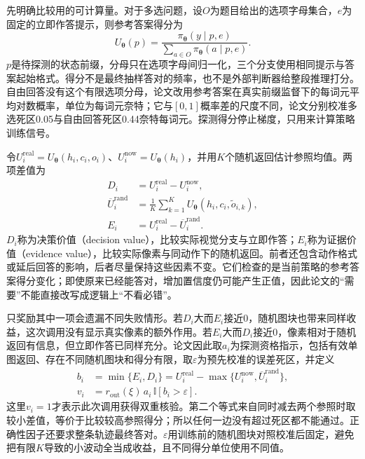 先明确比较用的可计算量。对于多选问题，设$O$为题目给出的选项字母集合，$e$为固定的立即作答提示，则参考答案得分为
\begin{equation}
  U_{\bm\theta}(p)
   =\frac{\pi_{\bm\theta}(y\mid p,e)}
          {\sum_{a\in O}\pi_{\bm\theta}(a\mid p,e)}.
  \label{eq:vision-countercredit-score}
\end{equation}
$p$是待探测的状态前缀，分母只在选项字母间归一化，三个分支使用相同提示与答案起始格式。得分不是最终抽样答对的频率，也不是外部判断器给整段推理打分。自由回答没有这个有限选项分母，论文改用参考答案在真实前缀监督下的每词元平均对数概率，单位为每词元奈特；它与$[0,1]$概率差的尺度不同，论文分别校准多选死区0.05与自由回答死区0.44奈特每词元。探测得分停止梯度，只用来计算策略训练信号。

令$U_i^{\mathrm{real}}=U_{\bm\theta}(h_i,c_i,o_i)$、$U_i^{\mathrm{now}}=U_{\bm\theta}(h_i)$，并用$K$个随机返回估计参照均值。两项差值为
\begin{equation}
  \begin{aligned}
    D_i&=U_i^{\mathrm{real}}-U_i^{\mathrm{now}},\\
    \overline U_i^{\mathrm{rand}}
      &=\frac1K\sum_{k=1}^{K}
          U_{\bm\theta}(h_i,c_i,\widetilde o_{i,k}),\\
    E_i&=U_i^{\mathrm{real}}-\overline U_i^{\mathrm{rand}}.
  \end{aligned}
  \label{eq:vision-countercredit-values}
\end{equation}
$D_i$称为决策价值（decision value），比较实际视觉分支与立即作答；$E_i$称为证据价值（evidence value），比较实际像素与同动作下的随机返回。前者还包含动作格式或延后回答的影响，后者尽量保持这些因素不变。它们检查的是当前策略的参考答案得分变化；即使原来已经能答对，增加置信度仍可能产生正值，因此论文的“需要”不能直接改写成逻辑上“不看必错”。

只奖励其中一项会遗漏不同失败情形。若$D_i$大而$E_i$接近0，随机图块也带来同样收益，这次调用没有显示真实像素的额外作用。若$E_i$大而$D_i$接近0，像素相对于随机返回有信息，但立即作答已同样充分。论文因此取$a_i$为探测资格指示，包括有效单图返回、存在不同随机图块和得分有限，取$\varepsilon$为预先校准的误差死区，并定义
\begin{equation}
  \begin{aligned}
    b_i&=\min\{E_i,D_i\}
        =U_i^{\mathrm{real}}
          -\max\{U_i^{\mathrm{now}},\overline U_i^{\mathrm{rand}}\},\\
    v_i&=r_{\mathrm{out}}(\xi)\,a_i\,\mathbb I[b_i>\varepsilon].
  \end{aligned}
  \label{eq:vision-countercredit-verification}
\end{equation}
这里$v_i=1$才表示此次调用获得双重核验。第二个等式来自同时减去两个参照时取较小差值，等价于比较较高参照得分；所以任何一边没有超过死区都不能通过。正确性因子还要求整条轨迹最终答对。$\varepsilon$用训练前的随机图块对照校准后固定，避免把有限$K$导致的小波动全当成收益，且不同得分单位使用不同值。

